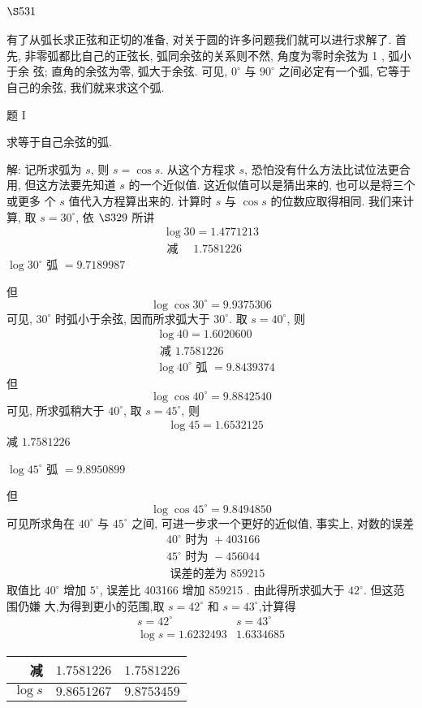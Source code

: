 \section{$\S 531$}

有了从弧长求正弦和正切的准备, 对关于圆的许多问题我们就可以进行求解了. 首 先, 非零弧都比自己的正弦长, 弧同余弦的关系则不然, 角度为零时余弦为 1 , 弧小于余 弦; 直角的余弦为零, 弧大于余弦. 可见, $0^{\circ}$ 与 $90^{\circ}$ 之间必定有一个弧, 它等于自己的余弦, 我们就来求这个弧.

题 I

求等于自己余弦的弧.

解: 记所求弧为 $s$, 则 $s=\cos s$. 从这个方程求 $s$, 恐怕没有什么方法比试位法更合用, 但这方法要先知道 $s$ 的一个近似值. 这近似值可以是猜出来的, 也可以是将三个或更多 个 $s$ 值代入方程算出来的. 计算时 $s$ 与 $\cos s$ 的位数应取得相同. 我们来计算, 取 $s=30^{\circ}$, 依 $\S 329$ 所讲
\[
\begin{gathered}
\log 30=1.4771213 \\
\text { 减 } \quad 1.7581226
\end{gathered}
\]
$\log 30^{\circ}$ 弧 $=9.7189987$

但
\[
\log \cos 30^{\circ}=9.9375306
\]
可见, $30^{\circ}$ 时弧小于余弦, 因而所求弧大于 $30^{\circ}$. 取 $s=40^{\circ}$, 则
\[
\begin{aligned}
& \log 40=1.6020600 \\
& \text { 减 } 1.7581226 \\
& \log 40^{\circ} \text { 弧 }=9.8439374
\end{aligned}
\]
但
\[
\log \cos 40^{\circ}=9.8842540
\]
可见, 所求弧稍大于 $40^{\circ}$, 取 $s=45^{\circ}$, 则
\[
\begin{aligned}
& \log 45=1.6532125
\end{aligned}
\]
减 $1.7581226$

$\log 45^{\circ}$ 弧 $=9.8950899$

但
\[
\log \cos 45^{\circ}=9.8494850
\]
可见所求角在 $40^{\circ}$ 与 $45^{\circ}$ 之间, 可进一步求一个更好的近似值, 事实上, 对数的误差
\[
\begin{aligned}
& 40^{\circ} \text { 时为 }+403166 \\
& 45^{\circ} \text { 时为 }-456044 \\
& \text { 误差的差为 } 859215
\end{aligned}
\]
取值比 $40^{\circ}$ 增加 $5^{\circ}$, 误差比 403166 增加 859215 . 由此得所求弧大于 $42^{\circ}$. 但这范围仍嫌 大,为得到更小的范围,取 $s=42^{\circ}$ 和 $s=43^{\circ}$,计算得
\[
\begin{array}{cc}
s=42^{\circ} & s=43^{\circ} \\
\log s=1.6232493 & 1.6334685
\end{array}
\]
\begin{tabular}{rll} 
减 & $1.7581226$ & $1.7581226$ \\
\hline $\log s$ & $9.8651267$ & $9.8753459$
\end{tabular}


